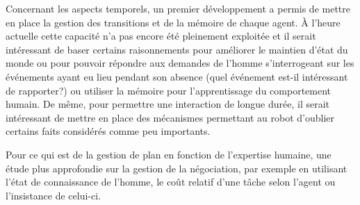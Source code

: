 \documentclass[a4paper,11pt,twoside]{StyleThese}
\begin{document}
Concernant les aspects temporels, un premier développement a permis de mettre en place la gestion des transitions et de la mémoire de chaque agent. À l'heure actuelle cette capacité n'a pas encore été pleinement exploitée et il serait intéressant de baser certains raisonnements pour améliorer le maintien d'état du monde ou pour pouvoir répondre aux demandes de l'homme s'interrogeant sur les événements ayant eu lieu pendant son absence (quel événement est-il intéressant de rapporter?) ou utiliser la mémoire pour l'apprentissage du comportement humain. De même, pour permettre une interaction de longue durée, il serait intéressant de mettre en place des mécanismes permettant au robot d'oublier certains faits considérés comme peu importants.

Pour ce qui est de la gestion de plan en fonction de l'expertise humaine, une étude plus approfondie sur la gestion de la négociation, par exemple en utilisant l'état de connaissance de l'homme, le coût relatif d'une tâche selon l'agent ou l'insistance de celui-ci.
 

\ifdefined{}
\else


\end{document}
